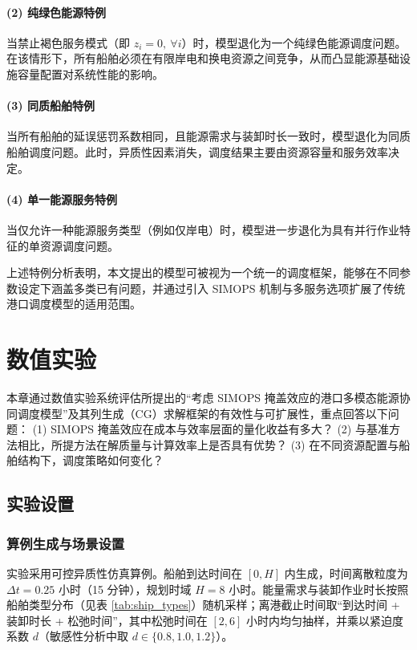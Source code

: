 \documentclass[UTF8, a4paper, 12pt]{ctexart}
\begin{document}
\paragraph{(2) 纯绿色能源特例}
当禁止褐色服务模式（即 $z_i=0,\ \forall i$）时，模型退化为一个纯绿色能源调度问题。在该情形下，所有船舶必须在有限岸电和换电资源之间竞争，从而凸显能源基础设施容量配置对系统性能的影响。

\paragraph{(3) 同质船舶特例}
当所有船舶的延误惩罚系数相同，且能源需求与装卸时长一致时，模型退化为同质船舶调度问题。此时，异质性因素消失，调度结果主要由资源容量和服务效率决定。

\paragraph{(4) 单一能源服务特例}
当仅允许一种能源服务类型（例如仅岸电）时，模型进一步退化为具有并行作业特征的单资源调度问题。

上述特例分析表明，本文提出的模型可被视为一个统一的调度框架，能够在不同参数设定下涵盖多类已有问题，并通过引入 SIMOPS 机制与多服务选项扩展了传统港口调度模型的适用范围。


\section{数值实验}
\label{sec:computational}

本章通过数值实验系统评估所提出的“考虑 SIMOPS 掩盖效应的港口多模态能源协同调度模型”及其列生成（CG）求解框架的有效性与可扩展性，重点回答以下问题：
(1) SIMOPS 掩盖效应在成本与效率层面的量化收益有多大？
(2) 与基准方法相比，所提方法在解质量与计算效率上是否具有优势？
(3) 在不同资源配置与船舶结构下，调度策略如何变化？

\subsection{实验设置}
\label{sec:exp_setup}

\subsubsection{算例生成与场景设置}
\label{sec:data_instances}
实验采用可控异质性仿真算例。船舶到达时间在 $[0,H]$ 内生成，时间离散粒度为 $\Delta t=0.25$ 小时（15 分钟），规划时域 $H=8$ 小时。能量需求与装卸作业时长按照船舶类型分布（见表 \ref{tab:ship_types}）随机采样；离港截止时间取“到达时间 + 装卸时长 + 松弛时间”，其中松弛时间在 $[2,6]$ 小时内均匀抽样，并乘以紧迫度系数 $d$（敏感性分析中取 $d\in\{0.8,1.0,1.2\}$）。
\end{document}
